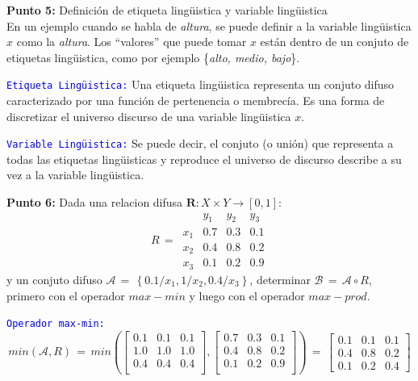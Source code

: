 \documentclass[10pt,onecolumn,twoside,letterpaper]{article}
\newcommand{\myreferences}{../../../doc/review/review/library}
\begin{document}
\par{\bf \large Punto 5:} Definici\'on de etiqueta ling\"uistica y variable ling\"uistica\\
En un ejemplo cuando se habla de \emph{altura}, se puede definir a la variable ling\"uistica $x$ como la \emph{altura}. Los ``valores'' que puede tomar $x$ est\'an dentro de un conjuto de etiquetas ling\"uistica, como por ejemplo \{\emph{alto, medio, bajo}\}.
\par \textcolor{blue}{\texttt{Etiqueta Ling\"uistica:}} Una etiqueta ling\"uistica representa un conjuto difuso caracterizado por una funci\'on de pertenencia o membrec\'ia. Es una forma de discretizar el universo discurso de una variable ling\"uistica $x$.
\par \textcolor{blue}{\texttt{Variable Ling\"uistica:}} Se puede decir, el conjuto (o uni\'on) que representa a todas las etiquetas ling\"uisticas y reproduce el universo de discurso describe a su vez a la variable ling\"uistica.
\par{\bf \large Punto 6:} Dada una relacion difusa $\mathbf{R}:X\times Y\to[0,1]$:\\
\begin{equation*}
  \label{eq:relation}
  R\,=\,
  \begin{array}{cccc}
    &y_1&y_2&y_3\\
    x_1&0.7&0.3&0.1\\
    x_2&0.4&0.8&0.2\\
    x_3&0.1&0.2&0.9
  \end{array}
\end{equation*}
y un conjuto difuso $\mathcal{A}\,=\,\left\{0.1/x_1,1/x_2,0.4/x_3\right\}$, determinar $\mathcal{B}\,=\,\mathcal{A}\circ R$, primero con el operador $max-min$ y luego con el operador $max-prod$.
\par \textcolor{blue}{\texttt{Operador max-min:}} 
\begin{equation*}
  \label{eq:relation}
  min(\mathcal{A},R)\,=\,min(\left[
  \begin{array}{ccc}
    0.1&0.1&0.1\\
    1.0&1.0&1.0\\
    0.4&0.4&0.4\\
  \end{array}\right],\left[
  \begin{array}{ccc}
    0.7&0.3&0.1\\
    0.4&0.8&0.2\\
    0.1&0.2&0.9\\
  \end{array}\right])\,=\,\left[
  \begin{array}{ccc}
    0.1&0.1&0.1\\
    0.4&0.8&0.2\\
    0.1&0.2&0.4
  \end{array}\right]
\end{equation*}

\end{document}

